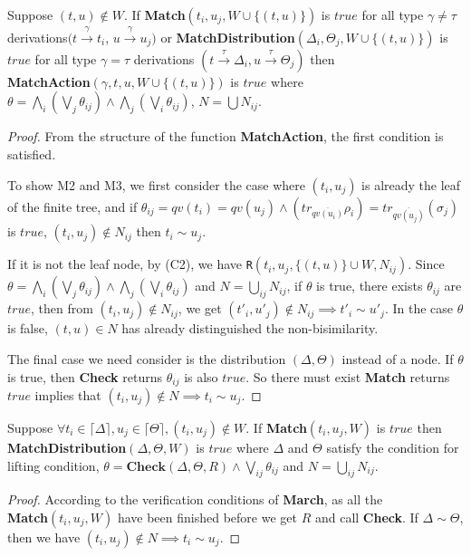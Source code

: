 \documentclass[a4paper,UKenglish,cleveref, autoref]{lipics-v2019}
\begin{document}
\begin{proposition} Suppose $(t,u)\notin W$.
If \textbf{Match}$(t_i,u_j,W\cup\{(t,u)\})$ is $true$ for all type $\gamma\neq\tau$ derivations$(t\xrightarrow{\gamma}t_i$, $u\xrightarrow{\gamma}u_j)$ or \textbf{MatchDistribution}$(\Delta_i,\Theta_j,W\cup\{(t,u)\})$ is $true$ for all type $\gamma=\tau$ derivations $(t\xrightarrow{\tau}\Delta_i,u\xrightarrow{\tau}\Theta_j)$ then\\
\textbf{MatchAction}$(\gamma,t,u,W\cup\{(t,u)\})$ is $true$ where
$\theta=\bigwedge_i(\bigvee_j\theta_{ij})\wedge\bigwedge_j(\bigvee_i\theta_{ij})$, $N=\bigcup N_{ij}$.
\end{proposition}
\begin{proof}
From the structure of the function \textbf{MatchAction}, the first condition is satisfied.

To show M2 and M3, we first consider the case where $(t_i,u_j)$ is already the leaf of the finite tree, and if $\theta_{ij}=qv(t_i)=qv(u_j)\wedge(tr_{\overline{qv(u_i)}}\rho_i)=tr_{\overline{qv(u_j)}}(\sigma_j)$ is $true$, $(t_i,u_j)\notin N_{ij}$ then $t_i\sim u_j$. 

If it is not the leaf node, by (C2), we have \texttt{R}$(t_i,u_j,\{(t,u)\}\cup W,N_{ij})$. Since 
$\theta=\bigwedge_i(\bigvee_j\theta_{ij})\wedge\bigwedge_j(\bigvee_i\theta_{ij})$ and $N=\bigcup_{ij}N_{ij}$, if $\theta$ is true, there exists $\theta_{ij}$ are $true$, then from $(t_i,u_j)\notin N_{ij}$, we get $(t'_i,u'_j)\notin N_{ij}\implies t'_i\sim u'_j$. In the case $\theta$ is false, $(t,u)\in N$ has already distinguished the non-bisimilarity.

The final case we need consider is the distribution $(\Delta,\Theta)$ instead of a node. If $\theta$ is true, then \textbf{Check} returns $\theta_{ij}$ is also $true$. So there must exist \textbf{Match} returns $true$ implies that $(t_i,u_j)\notin N\implies t_i\sim u_j$.
\end{proof}

\begin{proposition}
Suppose $\forall t_i\in\lceil\Delta\rceil,u_j\in\lceil\Theta\rceil , (t_i,u_j)\notin W$.
If \textbf{Match}$(t_i,u_j,W)$ is $true$ then \textbf{MatchDistribution}$(\Delta,\Theta,W)$ is $true$ where $\Delta$ and $\Theta$ satisfy the condition for lifting condition, $\theta=\textbf{Check}(\Delta,\Theta,\textit{R})\wedge\bigvee_{ij}\theta_{ij}$  and $N=\bigcup_{ij}N_{ij}$.
\end{proposition}
\begin{proof}
According to the verification conditions of \textbf{March}, as all the \\\textbf{Match}$(t_i,u_j,W)$ have been finished before we get $R$ and call \textbf{Check}. If $\Delta\sim \Theta$, then we have $(t_i,u_j)\notin N\implies t_i\sim u_j$.
\end{proof}
\end{document}
